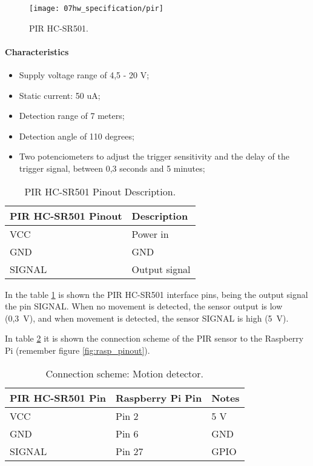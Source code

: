 \begin{figure}[H]
	\centering
	\texttt{[image: 07hw\_specification/pir]}
	\caption{PIR HC-SR501.}
	\label{fig:pir}
\end{figure}

\paragraph*{Characteristics}
\begin{itemize}
	\item Supply voltage range of 4,5 - 20 V;
	\item Static current: 50 uA;
	\item Detection range of 7 meters;
	\item Detection angle of 110 degrees;
	\item Two potenciometers to adjust the trigger sensitivity and the delay of the trigger signal, between 0,3 seconds and 5 minutes;
\end{itemize}

\begin{table}[H]
	\centering
	\begin{tabular}{|m{5cm}|m{6cm}|}
		\hline
		\textbf{PIR HC-SR501 Pinout} & \textbf{Description}
		\\\hline\hline
		VCC & Power in
		\\\hline
		GND & GND
		\\\hline
		SIGNAL & Output signal
		\\\hline
	\end{tabular}
	
	\caption{PIR HC-SR501 Pinout Description.}
	\label{table:desc_pir}
\end{table}

In the table \ref{table:desc_pir} is shown the PIR HC-SR501 interface pins, being the output signal the pin SIGNAL. When no movement is detected, the sensor output is low (0,3~V), and when movement is detected, the sensor SIGNAL is high (5~V). 

In table \ref{table:connect_pir} it is shown the connection scheme of the PIR sensor to the Raspberry Pi (remember figure \ref{fig:rasp_pinout}).

\begin{table}[H]
	\centering
	\begin{tabular}{|m{5cm}|m{4cm}|m{3cm}|}
		\hline
		\textbf{PIR HC-SR501 Pin} & \textbf{Raspberry Pi Pin} & \textbf{Notes} 
		\\\hline\hline
		VCC & Pin 2 & 5 V
		\\\hline
		GND & Pin 6 & GND
		\\\hline
		SIGNAL & Pin 27 & GPIO
		\\\hline
	\end{tabular}
	
	\caption{Connection scheme: Motion detector.}
	\label{table:connect_pir}
\end{table}


